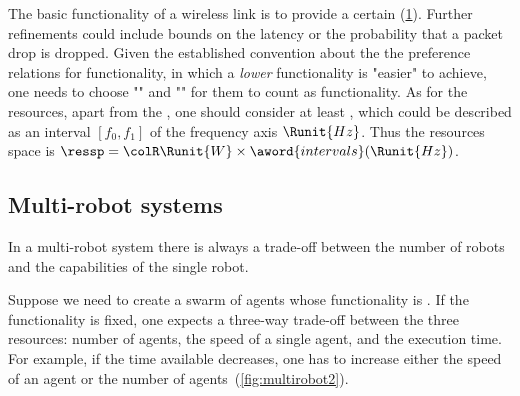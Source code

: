 \begin{example}
    The basic functionality of a wireless link is to provide
    a certain  (\cref{fig:networklink}). Further refinements could include bounds
    on the latency or the probability that a packet drop is dropped. Given
    the established convention about the the preference relations for
    functionality, in which a \emph{lower} functionality is "easier"
    to achieve, one needs to choose ""
    and "" for them
    to count as functionality. As for the resources, apart from the , one should consider at least ,
    which could be described as an interval $[f_0,f_1]$ of the frequency
    axis $\Runit{Hz}$. Thus the resources space is $\ressp=\colR\Runit{W}\times\aword{intervals}(\Runit{Hz})$.
\end{example}

\begin{figure}[h]
    \begin{center}
    \end{center}
    \caption{ \label{fig:networklink}}
\end{figure}

\subsection{Multi-robot systems}

In a multi-robot system there is always a trade-off between the number
of robots and the capabilities of the single robot.
\begin{example}
    Suppose we need to create a swarm of agents whose functionality is
    . If the functionality is fixed, one expects
    a three-way trade-off between the three resources: number of agents,
    the speed of a single agent, and the execution time. For example,
    if the time available decreases, one has to increase either the speed
    of an agent or the number of agents~(\cref{fig:multirobot2}).
\end{example}

\begin{figure}[h]
    \caption{}
\end{figure}

